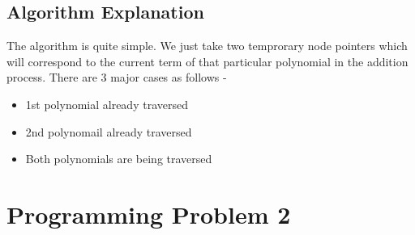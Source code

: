 \documentclass[20pt]{article}
\begin{document}
\subsection{Algorithm Explanation}
The algorithm is quite simple. We just take two temprorary node pointers which will correspond to the current term of that particular polynomial in the addition process. There are 3 major cases as follows -

\begin{itemize}
\item 1st polynomial already traversed

\item 2nd polynomail already traversed

\item Both polynomials are being traversed
\end{itemize}

\newpage
\section{Programming Problem 2}
\end{document}
